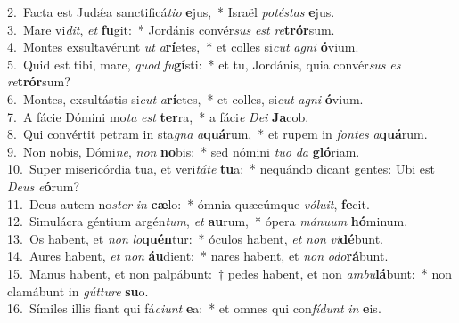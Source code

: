 {2.~}Facta est Judǽa sanctificá\textit{ti}\textit{o} \textbf{e}jus,~* Israël \textit{po}\textit{té}\textit{stas} \textbf{e}jus.\\
{3.~}Mare vi\textit{dit}, \textit{et} \textbf{fu}git:~* Jordánis convér\textit{sus} \textit{est} \textit{re}\textbf{trór}sum.\\
{4.~}Montes exsultavérunt \textit{ut} \textit{a}\textbf{rí}etes,~* et colles si\textit{cut} \textit{a}\textit{gni} \textbf{ó}vium.\\
{5.~}Quid est tibi, mare, \textit{quod} \textit{fu}\textbf{gí}sti:~* et tu, Jordánis, quia convér\textit{sus} \textit{es} \textit{re}\textbf{trór}sum?\\
{6.~}Montes, exsultástis si\textit{cut} \textit{a}\textbf{rí}etes,~* et colles, si\textit{cut} \textit{a}\textit{gni} \textbf{ó}vium.\\
{7.~}A fácie Dómini mo\textit{ta} \textit{est} \textbf{ter}ra,~* a fáci\textit{e} \textit{De}\textit{i} \textbf{Ja}cob.\\
{8.~}Qui convértit petram in sta\textit{gna} \textit{a}\textbf{quá}rum,~* et rupem in \textit{fon}\textit{tes} \textit{a}\textbf{quá}rum.\\
{9.~}Non nobis, Dómi\textit{ne}, \textit{non} \textbf{no}bis:~* sed nómini \textit{tu}\textit{o} \textit{da} \textbf{gló}riam.\\
{10.~}Super misericórdia tua, et veri\textit{tá}\textit{te} \textbf{tu}a:~* nequándo dicant gentes: Ubi est \textit{De}\textit{us} \textit{e}\textbf{ó}rum?\\
{11.~}Deus autem no\textit{ster} \textit{in} \textbf{cæ}lo:~* ómnia quæcúmque \textit{vó}\textit{lu}\textit{it}, \textbf{fe}cit.\\
{12.~}Simulácra géntium argén\textit{tum}, \textit{et} \textbf{au}rum,~* ópera \textit{má}\textit{nu}\textit{um} \textbf{hó}minum.\\
{13.~}Os habent, et \textit{non} \textit{lo}\textbf{quén}tur:~* óculos habent, \textit{et} \textit{non} \textit{vi}\textbf{dé}bunt.\\
{14.~}Aures habent, \textit{et} \textit{non} \textbf{áu}dient:~* nares habent, et \textit{non} \textit{o}\textit{do}\textbf{rá}bunt.\\
{15.~}Manus habent, et non palpábunt:~† pedes habent, et non \textit{am}\textit{bu}\textbf{lá}bunt:~* non clamábunt in \textit{gút}\textit{tu}\textit{re} \textbf{su}o.\\
{16.~}Símiles illis fiant qui fá\textit{ci}\textit{unt} \textbf{e}a:~* et omnes qui con\textit{fí}\textit{dunt} \textit{in} \textbf{e}is.\\
